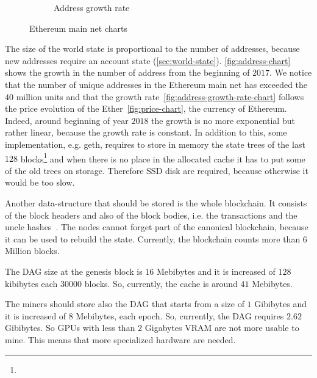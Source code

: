 \begin{figure}
\begin{subfigure}[b]{0.5\textwidth}
        \caption{Address growth rate}
        \label{fig:address-growth-rate-chart}
    \end{subfigure}
    \caption{Ethereum main net charts}
\end{figure}

The size of the world state is proportional to the number of addresses, because
new addresses require an account state (\autoref{sec:world-state}).
\autoref{fig:address-chart} shows the growth in the number of address from the
beginning of $2017$. We notice that the number of unique addresses in the
Ethereum main net has exceeded the $40$ million units and that the growth
rate~\autoref{fig:address-growth-rate-chart} follows the price evolution of the
Ether~\autoref{fig:price-chart}, the currency of Ethereum. Indeed, around
beginning of year $2018$ the growth is no more exponential but rather linear,
because the growth rate is constant.
In addition to this, some implementation, e.g. geth, requires to store in memory
the state trees of the last $128$
blocks\footnote{} and when there is no place in the allocated cache it has to
put some of the old trees on storage. Therefore SSD disk are required, because
otherwise it would be too slow.

Another data-structure that should be stored is the whole blockchain. It
consists of the block headers and also of the block bodies, i.e. the
transactions and the uncle hashes~\cite{wood2018ethereum}. The nodes cannot
forget part of the canonical blockchain, because it can be used to rebuild
the state. Currently, the blockchain counts more than $6$ Million blocks.

The DAG size at the genesis block is $16$ Mebibytes and it is increased of $128$
kibibytes each $30000$ blocks. So, currently, the cache is around $41$
Mebibytes.

The miners should store also the DAG that starts from a size of $1$ Gibibytes
and it is increased of $8$ Mebibytes, each epoch. So, currently, the DAG
requires $2.62$ Gibibytes. So GPUs with less than $2$ Gigabytes VRAM are not
more usable to mine. This means that more specialized hardware are needed.



